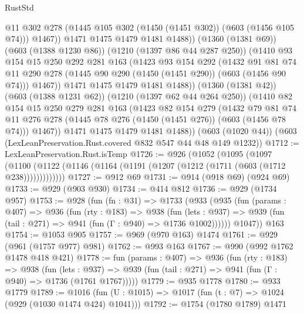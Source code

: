 \begin{lexlean}{RustStd}
\begin{coremodule}
                @11
                @302
                @278
                (@1445 @105 @302 (@1450 (@1451 @302)) (@603 (@1456 @105 @74)))
                @1467))
            @1471
            @1475
            @1479
            @1481
            @1488))
        (@1360 (@1381 @69))
        (@603 (@1388 @1230 @86))
        (@1210 (@1397 @86 @44 @287 @250))
        (@1410
          @93
          @154
          @15
          @250
          @292
          @281
          @163
          (@1423
            @93
            @154
            @292
            (@1432
              @91
              @81
              @74
              @11
              @290
              @278
              (@1445 @90 @290 (@1450 (@1451 @290)) (@603 (@1456 @90 @74)))
              @1467))
          @1471
          @1475
          @1479
          @1481
          @1488))
      (@1360 (@1381 @42))
      (@603 (@1388 @1231 @62))
      (@1210 (@1397 @62 @44 @264 @250))
      (@1410
        @82
        @154
        @15
        @250
        @279
        @281
        @163
        (@1423
          @82
          @154
          @279
          (@1432
            @79
            @81
            @74
            @11
            @276
            @278
            (@1445 @78 @276 (@1450 (@1451 @276)) (@603 (@1456 @78 @74)))
            @1467))
        @1471
        @1475
        @1479
        @1481
        @1488))
    (@603 (@1020 @44))
    (@603 (LexLeanPreservation.Rust.covered @832 @547 @44 @48 @149 @1232))
@1712 := LexLeanPreservation.Rust.isTemp
@1726 := @926
    (@1052
      (@1095
        (@1097
          (@1100 (@1122 (@1146 (@1164 (@1191 (@1207 (@1212 (@1711 (@603 (@1712 @238)))))))))))))
@1727 := @912 @69
@1731 := @914 (@918 @69) (@924 @69)
@1733 := @929 (@903 @930)
@1734 := @414 @812
@1736 := @929 (@1734 @957)
@1753 := @928
    (fun (fn : @31) =>
    @1733
      (@933
        (@935
          (fun (params : @407) =>
          @936
            (fun (rty : @183) =>
            @938
              (fun (lets : @937) =>
              @939 (fun (tail : @271) => @941 (fun (Γ : @940) => @1736 @1002))))))
        @1047))
    @163
@1754 := @1053 @905
@1757 := @969 (@970 @163) @1474
@1761 := @929 (@961 (@1757 @977) @981)
@1762 := @993 @163
@1767 := @990 (@992 @1762 @1478 @418 @421)
@1778 := fun (params : @407) =>
  @936
    (fun (rty : @183) =>
    @938
      (fun (lets : @937) =>
      @939 (fun (tail : @271) => @941 (fun (Γ : @940) => @1736 (@1761 @1767)))))
@1779 := @935 @1778
@1780 := @933 @1779
@1789 := @1016 (fun (U : @1015) => @1017 (fun (t : @7) => @1024 (@929 (@1030 @1474 @424) @1041)))
@1792 := @1754 (@1780 @1789) @1471

\end{coremodule}
\end{lexlean}

